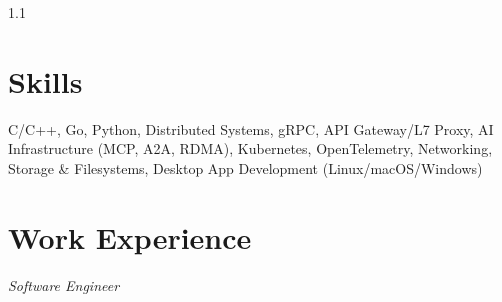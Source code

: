 \documentclass{yijiem}
\begin{document}
\begin{spacing}{1.1}
\end{spacing}

\section{Skills}
    C/C++, Go, Python, Distributed Systems, gRPC, API Gateway/L7 Proxy, AI Infrastructure (MCP, A2A, RDMA), \mbox{Kubernetes}, OpenTelemetry, Networking, Storage \& Filesystems, Desktop App Development (Linux/macOS/Windows)

\section{Work Experience}
    \textit{\small Software Engineer}
\end{document}
